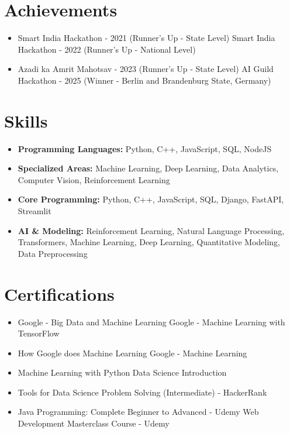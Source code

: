 \documentclass[a4paper,10pt]{article}
\begin{document}
\section*{Achievements}
\begin{itemize}
\item Smart India Hackathon - 2021 (Runner's Up - State Level) \hfill Smart India Hackathon - 2022 (Runner's Up - National Level)
\item Azadi ka Amrit Mahotsav - 2023 (Runner's Up - State Level) \hfill AI Guild Hackathon - 2025 (Winner - Berlin and Brandenburg State, Germany)
\end{itemize}

\section*{Skills}
\begin{itemize}
  \item \textbf{Programming Languages:} Python, C++, JavaScript, SQL, NodeJS
  \item \textbf{Specialized Areas:} Machine Learning, Deep Learning, Data Analytics, Computer Vision, Reinforcement Learning
  \item \textbf{Core Programming:} Python, C++, JavaScript, SQL, Django, FastAPI, Streamlit
  \item \textbf{AI \& Modeling:} Reinforcement Learning, Natural Language Processing, Transformers, Machine Learning, Deep Learning, Quantitative Modeling, Data Preprocessing
\end{itemize}

\section*{Certifications}
\begin{itemize}
\item Google - Big Data and Machine Learning \hfill Google - Machine Learning with TensorFlow
\item How Google does Machine Learning \hfill Google - Machine Learning
\item Machine Learning with Python \hfill Data Science Introduction
\item Tools for Data Science \hfill Problem Solving (Intermediate) - HackerRank
\item Java Programming: Complete Beginner to Advanced - Udemy \hfill Web Development Masterclass Course - Udemy
\end{itemize}
\end{document}
